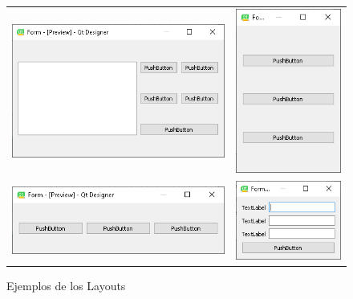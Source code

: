 \begin{figure}[H]
    \centering
    \begin{tabular}{c c}
        \includegraphics[scale=0.6]{imagenes/qtdesigner/qt_grid_layout.PNG} & 
        \includegraphics[scale=0.6]{imagenes/qtdesigner/qt_vertical_layout.PNG} \\ 
        \includegraphics[scale=0.6]{imagenes/qtdesigner/qt_horizontal_layout.PNG} & 
        \includegraphics[scale=0.6]{imagenes/qtdesigner/qt_form_layout.PNG} 
    \end{tabular}
    \caption{Ejemplos de los Layouts}
\end{figure}

